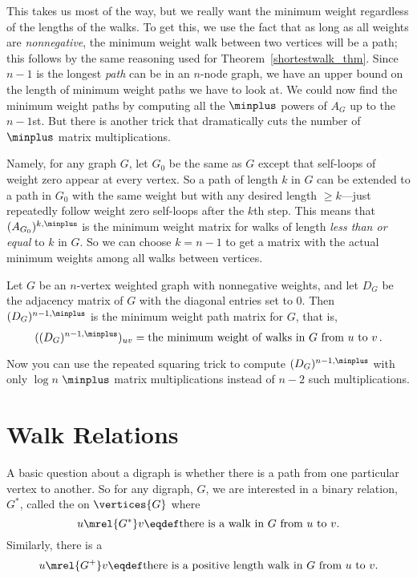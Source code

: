 \begin{editingnotes}
This takes us most of the way, but we really want the minimum weight
regardless of the lengths of the walks.  To get this, we use the fact that
as long as all weights are \emph{nonnegative}, the minimum weight walk
between two vertices will be a path; this follows by the same reasoning
used for Theorem~\ref{shortestwalk_thm}.  Since $n-1$ is the longest \emph{path}
can be in an $n$-node graph, we have an upper bound on the length of
minimum weight paths we have to look at.  We could now find the minimum
weight paths by computing all the $\minplus$ powers of $A_G$ up to the
$n-1$st.  But there is another trick that dramatically cuts the number of
$\minplus$ matrix multiplications.

Namely, for any graph $G$, let $G_0$ be the same as $G$ except that
self-loops of weight zero appear at every vertex.  So a path of length $k$
in $G$ can be extended to a path in $G_0$ with the same weight but with
any desired length $ \geq k$---just repeatedly follow weight zero
self-loops after the $k$th step.  This means that $(A_{G_0})^{k, \minplus}$
is the minimum weight matrix for walks of length \emph{less than or equal}
to $k$ in $G$.  So we can choose $k = n-1$ to get a matrix with the
actual minimum weights among all walks between vertices.

\begin{theorem}\label{thm:minweightmatrix}
Let $G$ be an $n$-vertex weighted graph with nonnegative weights, and let
$D_G$ be the adjacency matrix of $G$ with the diagonal entries set to 0.
Then $(D_G)^{n-1, \minplus}$ is the minimum weight path matrix for $G$, that
is,
\[
((D_G)^{n-1, \minplus})_{uv} = \text{the minimum weight of walks in $G$ from
 $u$ to $v$}\,.
\]
\end{theorem}
Now you can use the repeated squaring trick to compute $(D_G)^{n-1,
  \minplus}$ with only $\log n$ $\minplus$ matrix multiplications
instead of $n-2$ such multiplications.

\end{editingnotes}

\section{Walk Relations}
A basic question about a digraph is whether there is a path from one
particular vertex to another.  So for any digraph, $G$, we are
interested in a binary relation, $G^*$, called the  on $\vertices{G}$ where
\begin{equation}\label{G*def}
u \mrel{G^*} v \eqdef \mbox{there is a walk in $G$ from $u$ to $v$}.
\end{equation}
Similarly, there is a 
\begin{equation}\label{G+def}
u \mrel{G^+} v \eqdef \mbox{there is a positive length walk in $G$ from 
$u$ to $v$}.
\end{equation}

